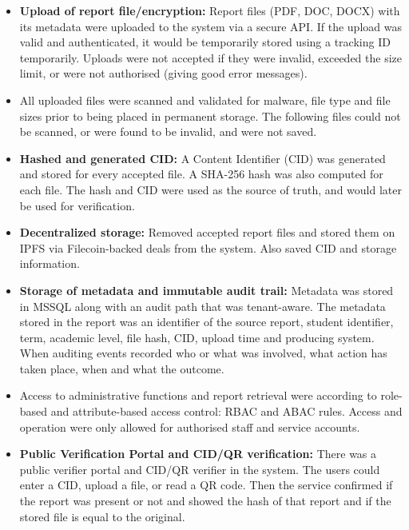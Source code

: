 \begin{itemize}
    \item \textbf{Upload of report file/encryption:} Report files (PDF, DOC, DOCX) with its metadata were uploaded to the system via a secure API. If the upload was valid and authenticated, it would be temporarily stored using a tracking ID temporarily. Uploads were not accepted if they were invalid, exceeded the size limit, or were not authorised (giving good error messages).

    \item All uploaded files were scanned and validated for malware, file type and file sizes prior to being placed in permanent storage. The following files could not be scanned, or were found to be invalid, and were not saved.

    \item \textbf{Hashed and generated CID:} A Content Identifier (CID) was generated and stored for every accepted file. A SHA-256 hash was also computed for each file. The hash and CID were used as the source of truth, and would later be used for verification.

    \item \textbf{Decentralized storage:} Removed accepted report files and stored them on IPFS via Filecoin-backed deals from the system. Also saved CID and storage information.

    \item \textbf{Storage of metadata and immutable audit trail:} Metadata was stored in MSSQL along with an audit path that was tenant-aware. The metadata stored in the report was an identifier of the source report, student identifier, term, academic level, file hash, CID, upload time and producing system. When auditing events recorded who or what was involved, what action has taken place, when and what the outcome.

    \item Access to administrative functions and report retrieval were according to role-based and attribute-based access control: RBAC and ABAC rules. Access and operation were only allowed for authorised staff and service accounts.

    \item \textbf{Public Verification Portal and CID/QR verification:} There was a public verifier portal and CID/QR verifier in the system. The users could enter a CID, upload a file, or read a QR code. Then the service confirmed if the report was present or not and showed the hash of that report and if the stored file is equal to the original.


\end{itemize}
